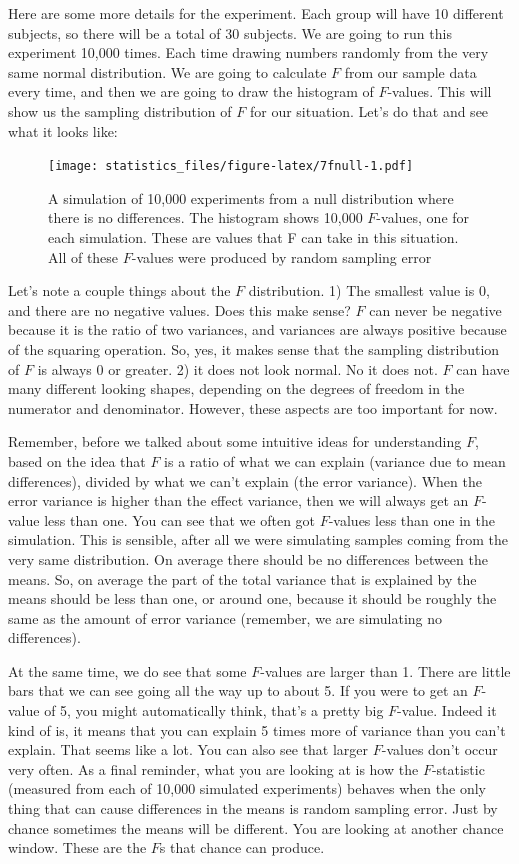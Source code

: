 \documentclass[]{book}
\begin{document}
Here are some more details for the experiment. Each group will have 10 different subjects, so there will be a total of 30 subjects. We are going to run this experiment 10,000 times. Each time drawing numbers randomly from the very same normal distribution. We are going to calculate \(F\) from our sample data every time, and then we are going to draw the histogram of \(F\)-values. This will show us the sampling distribution of \(F\) for our situation. Let's do that and see what it looks like:

\begin{figure}
\centering
\texttt{[image: statistics\_files/figure-latex/7fnull-1.pdf]}
\caption{\label{fig:7fnull}A simulation of 10,000 experiments from a null distribution where there is no differences. The histogram shows 10,000 \(F\)-values, one for each simulation. These are values that F can take in this situation. All of these \(F\)-values were produced by random sampling error}
\end{figure}

Let's note a couple things about the \(F\) distribution. 1) The smallest value is 0, and there are no negative values. Does this make sense? \(F\) can never be negative because it is the ratio of two variances, and variances are always positive because of the squaring operation. So, yes, it makes sense that the sampling distribution of \(F\) is always 0 or greater. 2) it does not look normal. No it does not. \(F\) can have many different looking shapes, depending on the degrees of freedom in the numerator and denominator. However, these aspects are too important for now.

Remember, before we talked about some intuitive ideas for understanding \(F\), based on the idea that \(F\) is a ratio of what we can explain (variance due to mean differences), divided by what we can't explain (the error variance). When the error variance is higher than the effect variance, then we will always get an \(F\)-value less than one. You can see that we often got \(F\)-values less than one in the simulation. This is sensible, after all we were simulating samples coming from the very same distribution. On average there should be no differences between the means. So, on average the part of the total variance that is explained by the means should be less than one, or around one, because it should be roughly the same as the amount of error variance (remember, we are simulating no differences).

At the same time, we do see that some \(F\)-values are larger than 1. There are little bars that we can see going all the way up to about 5. If you were to get an \(F\)-value of 5, you might automatically think, that's a pretty big \(F\)-value. Indeed it kind of is, it means that you can explain 5 times more of variance than you can't explain. That seems like a lot. You can also see that larger \(F\)-values don't occur very often. As a final reminder, what you are looking at is how the \(F\)-statistic (measured from each of 10,000 simulated experiments) behaves when the only thing that can cause differences in the means is random sampling error. Just by chance sometimes the means will be different. You are looking at another chance window. These are the \(F\)s that chance can produce.
\end{document}
